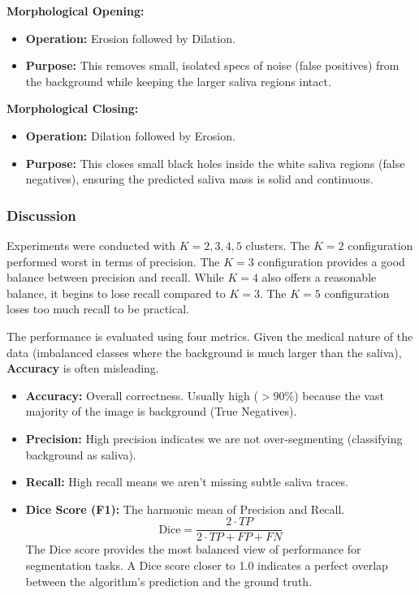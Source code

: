 \textbf{Morphological Opening:}

\begin{itemize}
  \item \textbf{Operation:} Erosion followed by Dilation.
  \item \textbf{Purpose:} This removes small, isolated specs of noise (false positives) from the background while keeping the larger saliva regions intact.
\end{itemize}

\textbf{Morphological Closing:}

\begin{itemize}
  \item \textbf{Operation:} Dilation followed by Erosion.
  \item \textbf{Purpose:} This closes small black holes inside the white saliva regions (false negatives), ensuring the predicted saliva mass is solid and continuous.
\end{itemize}

\subsubsection{Discussion}

Experiments were conducted with \(K=2, 3, 4, 5\) clusters. The \(K=2\) configuration performed worst in terms of precision. The \(K=3\) configuration provides a good balance between precision and recall. While \(K=4\) also offers a reasonable balance, it begins to lose recall compared to \(K=3\). The \(K=5\) configuration loses too much recall to be practical.

The performance is evaluated using four metrics. Given the medical nature of the data (imbalanced classes where the background is much larger than the saliva), \textbf{Accuracy} is often misleading.

\begin{itemize}
  \item \textbf{Accuracy:} Overall correctness. Usually high (\(>90\%\)) because the vast majority of the image is background (True Negatives).
  \item \textbf{Precision:} High precision indicates we are not over-segmenting (classifying background as saliva).
  \item \textbf{Recall:} High recall means we aren't missing subtle saliva traces.
  \item \textbf{Dice Score (F1):} The harmonic mean of Precision and Recall.
    \begin{equation}
      \text{Dice} = \frac{2 \cdot TP}{2 \cdot TP + FP + FN}
    \end{equation}
    The Dice score provides the most balanced view of performance for segmentation tasks. A Dice score closer to 1.0 indicates a perfect overlap between the algorithm's prediction and the ground truth.
\end{itemize}

